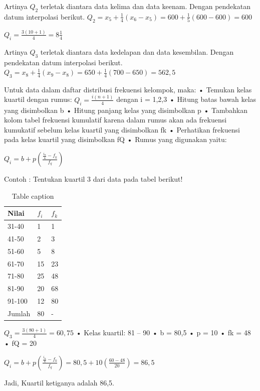\documentclass[11pt,fleqn]{book} %
\begin{document}
{Artinya $Q_{2}$ terletak diantara data kelima dan data keenam. Dengan pendekatan datum interpolasi berikut.
$Q_{2} = x_{5} + \frac{1}{4}(x_{6} - x_{5}) = 600 +\frac{1}{5}(600 -600) = 600$

$Q_{i} = \frac{3(10+1)}{4} = 8\frac{1}{4}$

Artinya $Q_{3}$ terletak diantara data kedelapan dan data kesembilan. Dengan pendekatan datum interpolasi berikut.
$Q_{3} = x_{8} + \frac{1}{4}(x_{9} - x_{8}) = 650 +\frac{1}{4}(700 -650) = 562,5$

Untuk data dalam daftar distribusi frekuensi kelompok, maka:
•	Temukan kelas kuartil dengan rumus:
$Q_{i} = \frac{i(n+1)}{4}$ dengan i = 1,2,3
•	Hitung batas bawah kelas yang disimbolkan b
•	Hitung panjang kelas yang disimbolkan p
•	Tambahkan kolom tabel frekuensi kumulatif karena dalam rumus akan ada frekuensi kumukatif sebelum kelas kuartil yang disimbolkan fk
•	Perhatikan frekuensi pada kelas kuartil yang disimbolkan fQ
•	Rumus yang digunakan yaitu:

$Q_{i} = b + p(\frac{\frac{i_{n}}{4}-f_{k}}{f_{q}})$

Contoh : Tentukan kuartil 3 dari data pada tabel berikut!

\begin{table}[h]
\centering
\begin{tabular}{l l l}
\toprule
\textbf{Nilai} & \textbf{$f_{i}$} & \textbf{$f_{k}$}\\
\midrule
31-40 & 1 & 1  \\
41-50 & 2 & 3 \\
51-60 & 5 & 8 \\
61-70 & 15 & 23 \\
71-80 & 25 & 48 \\
81-90 & 20 & 68 \\
91-100 & 12 & 80 \\
Jumlah & 80 & - \\
\bottomrule
\end{tabular}
\caption{Table caption}
\end{table}


$Q_{3} = \frac{3(80+1)}{4} = 60,75$
•	Kelas kuartil: 81 – 90 
•	b = 80,5
•	p = 10
•	fk = 48
•	fQ = 20

$Q_{i} = b + p(\frac{\frac{i_{n}}{4}-f_{k}}{f_{q}}) = 80,5 +10 (\frac{60-48}{20}) = 86,5$

Jadi, Kuartil ketiganya adalah 86,5.

}
\end{document}
